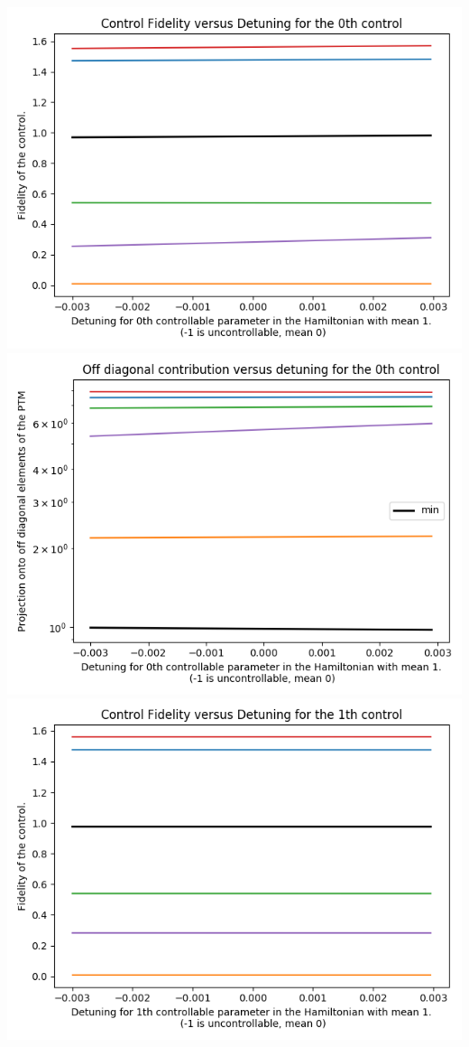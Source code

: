 \documentclass{article}
\begin{document}
\begin{center}
\includegraphics[scale=.9]{control_fid_1}
\includegraphics[scale=.9]{off_diag_1}
\includegraphics[scale=.9]{control_fid_2}

\end{center}
\end{document}
